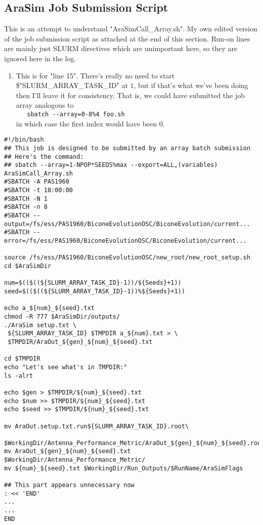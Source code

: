 \documentclass[12pt,letterpaper]{article}
\begin{document}
\subsection{AraSim Job Submission Script}
This is an attempt to understand "AraSimCall_Array.sh". My own edited version of
the job submission script as attached at the end of this section. Run-on lines
are mainly just SLURM directives which are unimportant here, so they are
ignored here in the log.
\begin{enumerate}
  \item This is for "line 15". 
    There's really no need to start \$"SLURM_ARRAY_TASK_ID" at $1$, but if that's 
    what we've been doing then I'll leave it for consistency.
    That is, we could have submitted the job array analogous to \\
      \verb|   sbatch --array=0-8%4 foo.sh| \\
    in which case the first index would have been $0$.
\end{enumerate}








\begin{verbatim}
#!/bin/bash
## This job is designed to be submitted by an array batch submission
## Here's the command:
## sbatch --array=1-NPOP*SEEDS%max --export=ALL,(variables) AraSimCall_Array.sh
#SBATCH -A PAS1960
#SBATCH -t 18:00:00
#SBATCH -N 1
#SBATCH -n 8
#SBATCH --output=/fs/ess/PAS1960/BiconeEvolutionOSC/BiconeEvolution/current...
#SBATCH --error=/fs/ess/PAS1960/BiconeEvolutionOSC/BiconeEvolution/current...

source /fs/ess/PAS1960/BiconeEvolutionOSC/new_root/new_root_setup.sh
cd $AraSimDir

num=$(($((${SLURM_ARRAY_TASK_ID}-1))/${Seeds}+1))
seed=$(($((${SLURM_ARRAY_TASK_ID}-1))%${Seeds}+1))

echo a_${num}_${seed}.txt
chmod -R 777 $AraSimDir/outputs/
./AraSim setup.txt \
 ${SLURM_ARRAY_TASK_ID} $TMPDIR a_${num}.txt > \
 $TMPDIR/AraOut_${gen}_${num}_${seed}.txt 

cd $TMPDIR
echo "Let's see what's in TMPDIR:"
ls -alrt 

echo $gen > $TMPDIR/${num}_${seed}.txt
echo $num >> $TMPDIR/${num}_${seed}.txt
echo $seed >> $TMPDIR/${num}_${seed}.txt

mv AraOut.setup.txt.run${SLURM_ARRAY_TASK_ID}.root\
 $WorkingDir/Antenna_Performance_Metric/AraOut_${gen}_${num}_${seed}.root
mv AraOut_${gen}_${num}_${seed}.txt $WorkingDir/Antenna_Performance_Metric/
mv ${num}_${seed}.txt $WorkingDir/Run_Outputs/$RunName/AraSimFlags

## This part appears unnecessary now
: << 'END'
...
...
END
\end{verbatim}




\end{document}
